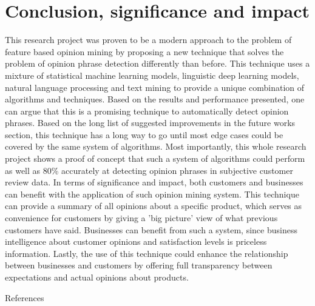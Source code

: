 \documentclass{sig-alternate}
\begin{document}
\section{Conclusion, significance and impact}
This research project was proven to be a modern approach to the problem of feature based opinion mining by proposing a new technique that solves the problem of opinion phrase detection differently than before. This technique uses a mixture of statistical machine learning models, linguistic deep learning models, natural language processing and text mining to provide a unique combination of algorithms and techniques. Based on the results and performance presented, one can argue that this is a promising technique to automatically detect opinion phrases. Based on the long list of suggested improvements in the future works section, this technique has a long way to go until most edge cases could be covered by the same system of algorithms. Most importantly, this whole research project shows a proof of concept that such a system of algorithms could perform as well as 80\% accurately at detecting opinion phrases in subjective customer review data.
In terms of significance and impact, both customers and businesses can benefit with the application of such opinion mining system. This technique can provide a summary of all opinions about a specific product, which serves as convenience for customers by giving a 'big picture' view of what previous customers have said. Businesses can benefit from such a system, since business intelligence about customer opinions and satisfaction levels is priceless information. Lastly, the use of this technique could enhance the relationship between businesses and customers by offering full transparency between expectations and actual opinions about products.

\centering
References


%

%


%
%
\end{document}
